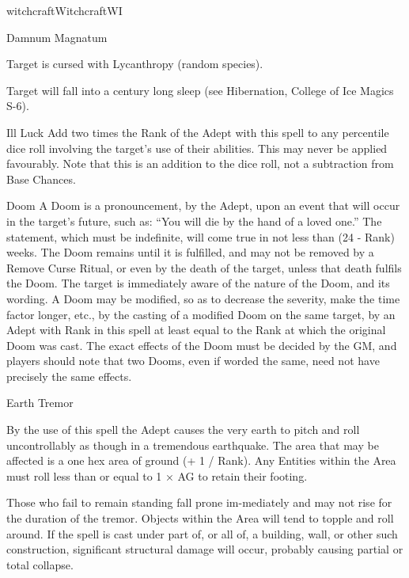 \begin{College}[1.1]{witchcraft}{Witchcraft}{WI}
\begin{spell}[S-10]{Damnum Magnatum}
\begin{effects}
\begin{Description}
\begin{Itemize}
\item Target is cursed with Lycanthropy (random species).

\item Target will fall into a century long sleep (see Hibernation,
  College of Ice Magics S-6).
\end{Itemize}

\item[Ill Luck] Add two times the Rank of the Adept with this spell to
  any percentile dice roll involving the target’s use of their
  abilities.  This may never be applied favourably. Note that this is
  an addition to the dice roll, not a subtraction from Base Chances.

\item[Doom] A Doom is a pronouncement, by the Adept, upon an event
  that will occur in the target’s future, such as: “You will die by
  the hand of a loved one.”  The statement, which must be indefinite,
  will come true in not less than (24 - Rank) weeks. The Doom remains
  until it is fulfilled, and may not be removed by a Remove Curse
  Ritual, or even by the death of the target, unless that death
  fulfils the Doom.  The target is immediately aware of the nature of
  the Doom, and its wording. A Doom may be modified, so as to decrease
  the severity, make the time factor longer, etc., by the casting of a
  modified Doom on the same target, by an Adept with Rank in this
  spell at least equal to the Rank at which the original Doom was
  cast.  The exact effects of the Doom must be decided by the GM,
  and players should note that two Dooms, even if worded the same,
  need not have precisely the same effects.
\end{Description}
\end{effects}
\end{spell}

\begin{spell}[S-11]{Earth Tremor}

\begin{effects}
By the use of this spell the Adept causes the very earth to pitch and
roll uncontrollably as though in a tremendous earthquake.  The area
that may be affected is a one hex area of ground (+ 1 / Rank). Any
Entities within the Area must roll less than or equal to 1 × AG to
retain their footing.

Those who fail to remain standing fall prone im-mediately and may not
rise for the duration of the tremor. Objects within the Area will tend
to topple and roll around. If the spell is cast under part of, or all
of, a building, wall, or other such construction, significant
structural damage will occur, probably causing partial or total
collapse.
\end{effects}
\end{spell}


\end{College}
